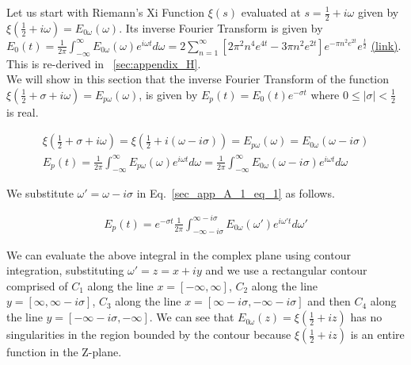 \documentclass[11pt]{elsarticle}
\begin{document}
Let us start with Riemann's Xi Function $\xi(s)$ evaluated at $s = \frac{1}{2} + i \omega$ given by $\xi(\frac{1}{2} + i \omega)= E_{0\omega}(\omega)$. Its inverse Fourier Transform is given by $ E_0(t)=  \frac{1}{2 \pi} \int_{-\infty}^{\infty} E_{0\omega}(\omega) e^{i\omega t} d\omega = 2 \sum_{n=1}^{\infty}  [ 2 \pi^{2} n^{4} e^{4t}    - 3 \pi n^{2}   e^{2t} ]  e^{- \pi n^{2} e^{2t}} e^{\frac{t}{2}}$ \href{https://www.ams.org/notices/200303/fea-conrey-web.pdf#page=5}{(link)}. This is re-derived in ~\ref{sec:appendix_H}.\\


We will show in this section that the inverse Fourier Transform of the function  $\xi(\frac{1}{2} + \sigma + i \omega) =  E_{p\omega}(\omega)$,  is given by $E_{p}(t) =   E_{0}(t) e^{-\sigma t}$  where $0 \leq |\sigma| < \frac{1}{2}$ is real.

\begin{eqnarray*}\label{sec_app_A_1_eq_1}
\xi(\frac{1}{2} + \sigma + i \omega) = \xi(\frac{1}{2} + i (\omega - i \sigma) ) = E_{p\omega}(\omega) = E_{0\omega}(\omega - i \sigma) \\
E_{p}(t) =   \frac{1}{2 \pi} \int_{-\infty}^{\infty} E_{p\omega}(\omega) e^{i\omega t} d\omega =   \frac{1}{2 \pi} \int_{-\infty}^{\infty} E_{0\omega}(\omega - i \sigma) e^{i\omega t} d\omega 
\end{eqnarray*}
\begin{equation} \end{equation}

 We substitute $\omega' = \omega - i \sigma$ in Eq.~\ref{sec_app_A_1_eq_1} as follows.
 
\begin{eqnarray*}\label{sec_app_A_1_eq_1_1}
E_{p}(t) =    e^{-\sigma t}  \frac{1}{2 \pi} \int_{-\infty  - i \sigma}^{\infty  - i \sigma} E_{0\omega}(\omega') e^{i\omega' t} d\omega'
\end{eqnarray*}
\begin{equation} \end{equation}

We can evaluate the above integral in the complex plane using contour integration, substituting $\omega' = z = x + i y$ and we use a rectangular contour comprised of $C_1$ along the line $ x = [-\infty, \infty]$, $C_2$ along the line $y = [\infty, \infty-i\sigma]$, $C_3$ along the line $x = [ \infty-i\sigma, -\infty-i\sigma]$ and then $C_4$ along the line $y = [-\infty-i\sigma, -\infty]$. We can see that $E_{0\omega}(z)=\xi(\frac{1}{2}+ i z)$ has no singularities in the region bounded by the contour because $\xi(\frac{1}{2}+ i z)$ is an entire function in the Z-plane.\\
\end{document}
